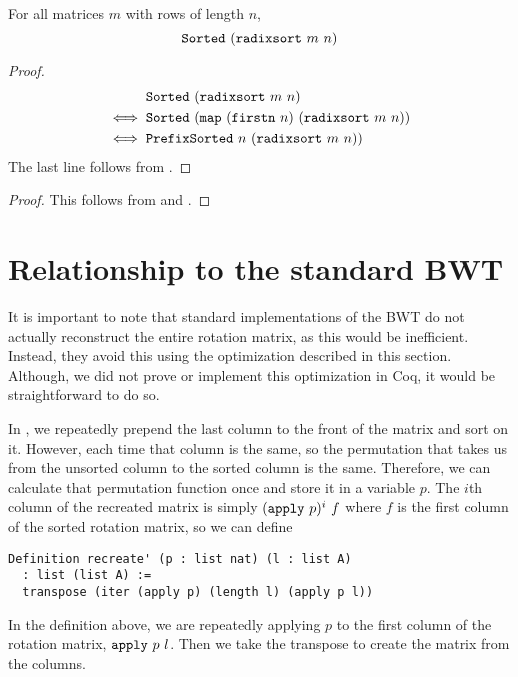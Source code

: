 \documentclass[sigplan,10pt,anonymous,review]{thesis}
\begin{document}
\begin{theorem}
  For all matrices $m$ with rows of length $n$,
  \begin{equation*}
      \texttt{\textup{Sorted}}~(\texttt{\textup{radixsort}}~m~n)
  \end{equation*}
\end{theorem}
\begin{proof}
  \begin{align*}
      &\texttt{\textup{Sorted}}~(\texttt{\textup{radixsort}}~m~n) \\
    \iff{}&\texttt{\textup{Sorted}}~(\texttt{\textup{map}}~(\texttt{\textup{firstn}}~n)~(\texttt{\textup{radixsort}}~m~n)) \\
    \iff{}&\texttt{\textup{PrefixSorted}}~n~(\texttt{\textup{radixsort}}~m~n))
  \end{align*}
  The last line follows from .
\end{proof}

\radixsortcorrect
\begin{proof}
  This follows from  and .
\end{proof}

\section{Relationship to the standard BWT}
\label{sec:opt}

It is important to note that standard implementations of the BWT do
not actually reconstruct the entire rotation matrix, as this would be
inefficient. Instead, they avoid this using the optimization described
in this section. Although, we did not prove or implement this
optimization in Coq, it would be straightforward to do so.

In , we repeatedly prepend the last column to the front
of the matrix and sort on it. However, each time that column is the
same, so the permutation that takes us from the unsorted column to the
sorted column is the same. Therefore, we can calculate that
permutation function once and store it in a variable $p$. The $i$th
column of the recreated matrix is simply $(\texttt{\textup{apply}}~p)^i~f$ where
$f$ is the first column of the sorted rotation matrix, so we can
define
\begin{lstlisting}
Definition recreate' (p : list nat) (l : list A)
  : list (list A) :=
  transpose (iter (apply p) (length l) (apply p l))
\end{lstlisting}
In the definition above, we are repeatedly applying $p$ to the
first column of the rotation matrix, $\texttt{\textup{apply}}~p~l$. Then we
take the transpose to create the matrix from the columns.
\end{document}
